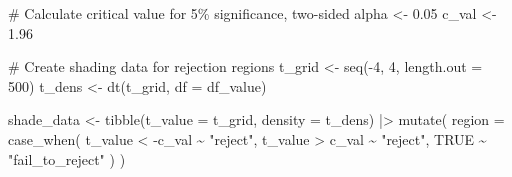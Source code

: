 \documentclass[
  letterpaper,
  DIV=11,
  numbers=noendperiod]{scrreprt}
\newenvironment{Shaded}{\begin{snugshade}}{\end{snugshade}}
\newcommand{\AttributeTok}[1]{\textcolor[rgb]{0.40,0.45,0.13}{#1}}
\newcommand{\CommentTok}[1]{\textcolor[rgb]{0.37,0.37,0.37}{#1}}
\newcommand{\ConstantTok}[1]{\textcolor[rgb]{0.56,0.35,0.01}{#1}}
\newcommand{\DecValTok}[1]{\textcolor[rgb]{0.68,0.00,0.00}{#1}}
\newcommand{\FloatTok}[1]{\textcolor[rgb]{0.68,0.00,0.00}{#1}}
\newcommand{\FunctionTok}[1]{\textcolor[rgb]{0.28,0.35,0.67}{#1}}
\newcommand{\NormalTok}[1]{\textcolor[rgb]{0.00,0.23,0.31}{#1}}
\newcommand{\OtherTok}[1]{\textcolor[rgb]{0.00,0.23,0.31}{#1}}
\newcommand{\SpecialCharTok}[1]{\textcolor[rgb]{0.37,0.37,0.37}{#1}}
\newcommand{\StringTok}[1]{\textcolor[rgb]{0.13,0.47,0.30}{#1}}
\begin{document}
\begin{Shaded}
\begin{Highlighting}[]
\CommentTok{\# Calculate critical value for 5\% significance, two{-}sided}
\NormalTok{alpha }\OtherTok{\textless{}{-}} \FloatTok{0.05}
\NormalTok{c\_val }\OtherTok{\textless{}{-}} \FloatTok{1.96}

\CommentTok{\# Create shading data for rejection regions}
\NormalTok{t\_grid }\OtherTok{\textless{}{-}} \FunctionTok{seq}\NormalTok{(}\SpecialCharTok{{-}}\DecValTok{4}\NormalTok{, }\DecValTok{4}\NormalTok{, }\AttributeTok{length.out =} \DecValTok{500}\NormalTok{)}
\NormalTok{t\_dens }\OtherTok{\textless{}{-}} \FunctionTok{dt}\NormalTok{(t\_grid, }\AttributeTok{df =}\NormalTok{ df\_value)}

\NormalTok{shade\_data }\OtherTok{\textless{}{-}} \FunctionTok{tibble}\NormalTok{(}\AttributeTok{t\_value =}\NormalTok{ t\_grid, }\AttributeTok{density =}\NormalTok{ t\_dens) }\SpecialCharTok{|\textgreater{}}
  \FunctionTok{mutate}\NormalTok{(}
    \AttributeTok{region =} \FunctionTok{case\_when}\NormalTok{(}
\NormalTok{      t\_value }\SpecialCharTok{\textless{}} \SpecialCharTok{{-}}\NormalTok{c\_val }\SpecialCharTok{\textasciitilde{}} \StringTok{"reject"}\NormalTok{,}
\NormalTok{      t\_value }\SpecialCharTok{\textgreater{}}\NormalTok{ c\_val }\SpecialCharTok{\textasciitilde{}} \StringTok{"reject"}\NormalTok{,}
      \ConstantTok{TRUE} \SpecialCharTok{\textasciitilde{}} \StringTok{"fail\_to\_reject"}
\NormalTok{    )}
\NormalTok{  )}


\end{Highlighting}
\end{Shaded}
\end{document}
